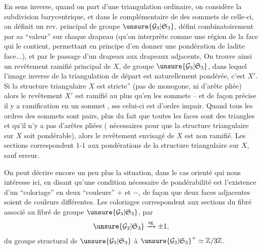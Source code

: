 En sens inverse, quand on part d'une triangulation ordinaire, on considère la subdivision barycentrique,  et dans le complémentaire de  des sommets de celle-ci, on définit un rev. principal  de groupe $\unsure{\mathcal G_3|\mathfrak S_3}$, défini combinatoirement par sa ``valeur'' sur chaque drapeau (qu'on interprète comme une région de la face qui le contient, permettant  en principe d'en donner une pondération de ladite face...), et par le passage d'un drapeau  aux drapeaux adjacents,  On trouve ainsi un revêtement ramifié principal  de $X$, de groupe $\unsure{\mathcal G_3|\mathfrak S_3}$,  dans lequel l'image inverse de la triangulation de départ
est naturellement pondérée, c'est $X'$. Si la structure triangulaire $X$ est  stricte'' (pas de monogone, ni d'arête pliée) alors le revêtement $X'$ est ramifié au plus qu'en les sommets -- et de façon précise  il y a ramification en un sommet , sss celui-ci est d'ordre impair. Quand tous les ordres des sommets sont pairs,  plus du fait que toutes les faces sont des triangles et qu'il n'y a pas d'arêtes pliées ( nécessaires pour que la structure  triangulaire sur $X$ soit pondérable), alors le revêtement envisagé de $X$ est non ramifié. Les sections correspondent $1$-$1$ aux pondérations de la structure triangulaire sur $X$, sauf erreur.

On peut décrire encore un peu plus la situation, dans  le cas orienté qui nous intéresse ici, en disant qu'une condition nécessaire de pondérabilité est l'existence d'un ``coloriage'' en deux ``couleurs'' $+$ et $-$, de façon que deux faces adjacentes soient de couleurs différentes. Les coloriages correspondent aux sections du fibré  associé au fibré de groupe $\unsure{\mathcal G_3|\mathfrak S_3}$, par
\[
\unsure{\mathcal G_3|\mathfrak S_3}\xrightarrow{\mathrm{sg}}\pm1,
\]
 
du groupe structural de $\unsure{\mathcal G_3|\mathfrak S_3}$ à $\unsure{\mathcal G_3|\mathfrak S_3}^+\simeq\mathbb Z/3\mathbb Z$.

